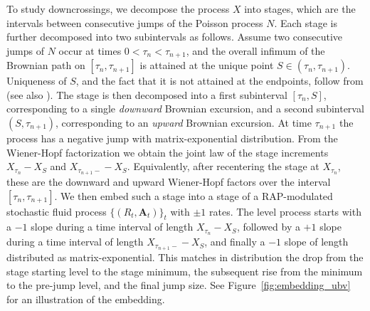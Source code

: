 \documentclass[a4paper,11pt]{article}
\numberwithin{equation}{section}
\theoremstyle{plain}
\theoremstyle{definition}
\newcommand{\1}{\mathbf{1}}
\begin{document}
To study downcrossings, we decompose the process $X$ into stages, which are the intervals between consecutive jumps of the Poisson process $N$. Each stage is further decomposed into two subintervals as follows. Assume two consecutive jumps of $N$ occur at times $0<\tau_n<\tau_{n+1}$, and the overall infimum of the Brownian path on $[\tau_n,\tau_{n+1}]$ is attained at the unique point $S\in (\tau_n,\tau_{n+1})$. Uniqueness of $S$, and the fact that it is not attained at the endpoints, follow from \cite{MR0433606} (see also \cite[Theorem 2]{MR4130409}). The stage is then decomposed into a first subinterval $[\tau_n,S]$, corresponding to a single \emph{downward} Brownian excursion, and a second subinterval $(S,\tau_{n+1})$, corresponding to an \emph{upward} Brownian excursion. At time $\tau_{n+1}$ the process has a negative jump with matrix-exponential distribution. From the Wiener-Hopf factorization we obtain the joint law of the stage increments $X_{\tau_n}-X_S$ and $X_{\tau_{n+1}-}-X_S$. Equivalently, after recentering the stage at $X_{\tau_n}$, these are the downward and upward Wiener-Hopf factors over the interval $[\tau_n,\tau_{n+1}]$. We then embed such a stage into a stage of a RAP-modulated stochastic fluid process $\{(R_t, \bm{A}_t)\}_t$ with $\pm 1$ rates. The level process starts with a $-1$ slope during a time interval of length $X_{\tau_n}-X_S$, followed by a $+1$ slope during a time interval of length $X_{\tau_{n+1}-}-X_S$, and finally a $-1$ slope of length distributed as matrix-exponential. This matches in distribution the drop from the stage starting level to the stage minimum, the subsequent rise from the minimum to the pre-jump level, and the final jump size. See Figure~\ref{fig:embedding_ubv} for an illustration of the embedding.
\end{document}
